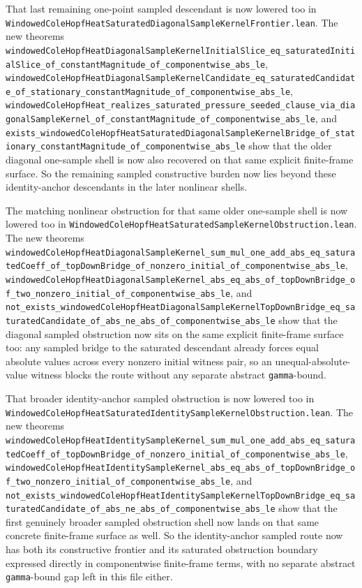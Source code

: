 \documentclass[11pt]{article}
\theoremstyle{remark}
\begin{document}
That last remaining one-point sampled descendant is now lowered too in
\texttt{WindowedColeHopfHeatSaturatedDiagonalSampleKernelFrontier.lean}.  The
new theorems
\texttt{windowedColeHopfHeatDiagonalSampleKernelInitialSlice\_eq\_saturatedInitialSlice\_of\_constantMagnitude\_of\_componentwise\_abs\_le},
\texttt{windowedColeHopfHeatDiagonalSampleKernelCandidate\_eq\_saturatedCandidate\_of\_stationary\_constantMagnitude\_of\_componentwise\_abs\_le},
\texttt{windowedColeHopfHeat\_realizes\_saturated\_pressure\_seeded\_clause\_via\_diagonalSampleKernel\_of\_constantMagnitude\_of\_componentwise\_abs\_le},
and
\texttt{exists\_windowedColeHopfHeatSaturatedDiagonalSampleKernelBridge\_of\_stationary\_constantMagnitude\_of\_componentwise\_abs\_le}
show that the older diagonal one-sample shell is now also recovered on that
same explicit finite-frame surface.  So the remaining sampled constructive
burden now lies beyond these identity-anchor descendants in the later
nonlinear shells.

The matching nonlinear obstruction for that same older one-sample shell is now
lowered too in
\texttt{WindowedColeHopfHeatSaturatedSampleKernelObstruction.lean}.  The new
theorems
\texttt{windowedColeHopfHeatDiagonalSampleKernel\_sum\_mul\_one\_add\_abs\_eq\_saturatedCoeff\_of\_topDownBridge\_of\_nonzero\_initial\_of\_componentwise\_abs\_le},
\texttt{windowedColeHopfHeatDiagonalSampleKernel\_abs\_eq\_abs\_of\_topDownBridge\_of\_two\_nonzero\_initial\_of\_componentwise\_abs\_le},
and
\texttt{not\_exists\_windowedColeHopfHeatDiagonalSampleKernelTopDownBridge\_eq\_saturatedCandidate\_of\_abs\_ne\_abs\_of\_componentwise\_abs\_le}
show that the diagonal sampled obstruction now sits on the same explicit
finite-frame surface too: any sampled bridge to the saturated descendant
already forces equal absolute values across every nonzero initial witness
pair, so an unequal-absolute-value witness blocks the route without any
separate abstract \texttt{gamma}-bound.

That broader identity-anchor sampled obstruction is now lowered too in
\texttt{WindowedColeHopfHeatSaturatedIdentitySampleKernelObstruction.lean}.
The new theorems
\texttt{windowedColeHopfHeatIdentitySampleKernel\_sum\_mul\_one\_add\_abs\_eq\_saturatedCoeff\_of\_topDownBridge\_of\_nonzero\_initial\_of\_componentwise\_abs\_le},
\texttt{windowedColeHopfHeatIdentitySampleKernel\_abs\_eq\_abs\_of\_topDownBridge\_of\_two\_nonzero\_initial\_of\_componentwise\_abs\_le},
and
\texttt{not\_exists\_windowedColeHopfHeatIdentitySampleKernelTopDownBridge\_eq\_saturatedCandidate\_of\_abs\_ne\_abs\_of\_componentwise\_abs\_le}
show that the first genuinely broader sampled obstruction shell now lands on
that same concrete finite-frame surface as well.  So the identity-anchor
sampled route now has both its constructive frontier and its saturated
obstruction boundary expressed directly in componentwise finite-frame terms,
with no separate abstract \texttt{gamma}-bound gap left in this file either.
\end{document}

